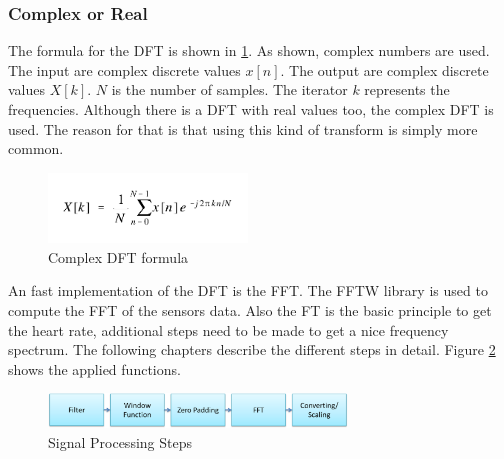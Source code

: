 \documentclass[notitlepage]{scrreprt}
\begin{document}
\subsubsection{Complex or Real}
The formula for the DFT is shown in \ref{fig:dft-formula}. As shown, complex numbers are used. The input are complex discrete values $x[n]$. The output are complex discrete values $X[k]$. $N$ is the number of samples. The iterator $k$ represents the frequencies. Although there is a DFT with real values too, the complex DFT is used. The reason for that is that using this kind of transform is simply more common.

\begin{figure}[H]
	\centering
	\includegraphics[width=200px]{images/complex_dft_formula.png}
	\caption{Complex DFT formula}
	\label{fig:dft-formula}
\end{figure}

An fast implementation of the DFT is the FFT. The FFTW library is used to compute the FFT of the sensors data. Also the FT is the basic principle to get the heart rate, additional steps need to be made to get a nice frequency spectrum. The following chapters describe the different steps in detail. Figure \ref{fig:signal-processing-steps1} shows the applied functions.

\begin{figure}[H]
	\centering
	\includegraphics[width=300px]{images/signal_processing_steps1.png}
	\caption{Signal Processing Steps}
	\label{fig:signal-processing-steps1}
\end{figure}
\end{document}
